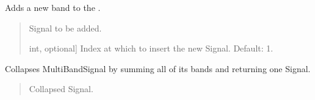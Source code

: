 \documentclass[letterpaper,10pt,english]{sphinxmanual}
\begin{document}
\begin{fulllineitems}
\begin{fulllineitems}
\label{\detokenize{classes:dsptools.classes.multibandsignal.MultiBandSignal.add_band}}
\pysigstartsignatures
{}
\pysigstopsignatures
\sphinxAtStartPar
Adds a new band to the .
\begin{quote}\begin{description}
\begin{description}
\sphinxlineitem{\sphinxstylestrong{sig}}{[}\sphinxtitleref{Signal}{]}
\sphinxAtStartPar
Signal to be added.

\sphinxlineitem{\sphinxstylestrong{index}}{[}int, optional{]}
\sphinxAtStartPar
Index at which to insert the new Signal. Default: \sphinxhyphen{}1.

\end{description}

\end{description}\end{quote}

\end{fulllineitems}


\begin{fulllineitems}
\label{\detokenize{classes:dsptools.classes.multibandsignal.MultiBandSignal.bands}}
\pysigstartsignatures
{}
\pysigstopsignatures
\end{fulllineitems}


\begin{fulllineitems}
\label{\detokenize{classes:dsptools.classes.multibandsignal.MultiBandSignal.collapse}}
\pysigstartsignatures
{}
\pysigstopsignatures
\sphinxAtStartPar
Collapses MultiBandSignal by summing all of its bands and returning
one Signal.
\begin{quote}\begin{description}
\begin{description}
\sphinxlineitem{\sphinxstylestrong{new\_sig}}{[}\sphinxtitleref{Signal}{]}
\sphinxAtStartPar
Collapsed Signal.


\end{description}
\end{description}
\end{quote}
\end{fulllineitems}
\end{fulllineitems}
\end{document}
